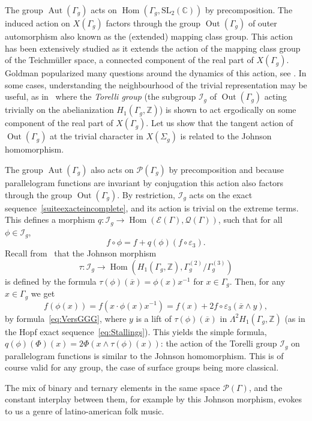 \documentclass[JEP,XML,SOM,Unicode,NoEqCountersInSection]{cedram}
\let\mathcal\mathscr
\theoremstyle{definition}
\newcommand{\ZZ}{\mathbb{Z}}
\newcommand{\CC}{\mathbb{C}}
\newcommand{\SL}{\mathrm{SL}}
\newcommand{\Aut}{\operatorname{Aut}}
\newcommand{\Out}{\operatorname{Out}}
\newcommand{\Hom}{\operatorname{Hom}}
\begin{document}
The group $\Aut(\Gamma_g)$ acts on $\Hom(\Gamma_g,\SL_2(\CC))$ by precomposition.
The induced action on $X(\Gamma_g)$ factors through the group
$\operatorname{Out}(\Gamma_g)$ of outer automorphism also known as the
(extended) mapping class group. This action has been extensively studied as
it extends the action of the mapping class group of the Teichmüller space,
a connected component of the real part of $X(\Gamma_g)$.
Goldman popularized many questions around the dynamics of this action,
see \eg \cite{goldman06}.
In some cases, understanding the neighbourhood of the trivial representation
may be useful, as in~\cite{FunarMarche} where the
{\em Torelli group} (\ie the subgroup
$\mathcal{I}_g$ of $\operatorname{Out}(\Gamma_g)$ acting trivially on
the abelianization $H_1(\Gamma_g,\ZZ)$) is shown to
act ergodically on some component of the real part of $X(\Gamma_g)$.
Let us show that the tangent action of $\Out(\Gamma_g)$ at the trivial
character in $X(\Sigma_g)$ is related to the Johnson homomorphism.

The group $\Aut(\Gamma_g)$ also acts on $\mathcal{P}(\Gamma_g)$
by precomposition and because parallelogram functions are invariant by
conjugation this action also factors through the group
$\operatorname{Out}(\Gamma_g)$.
By restriction, $\mathcal{I}_g$ acts on the exact
sequence~\eqref{suiteexacteincomplete},
and its action is trivial
on the extreme terms.
This
defines a morphism
$q\colon\mathcal{I}_g\to\Hom(\mathcal{E}(\Gamma),\mathcal{Q}(\Gamma))$,
such that for all $\phi\in\mathcal{I}_g$,
\[ f\circ\phi=f+q(\phi)(f\circ\varepsilon_3). \]
Recall from~\cite[Chap.\,6]{farbmargalit} that the Johnson morphism
\[
\tau:\mathcal{I}_g\to \Hom(H_1(\Gamma_g,\ZZ),\Gamma_g^{(2)}/\Gamma_g^{(3)})
\]
is defined by the formula $\tau(\phi)(\overline{x})=\phi(x)x^{-1}$ for
$x\in\Gamma_g$. Then, for any $x\in \Gamma_g$ we get
\[ f(\phi(x))=f(x\cdot \phi(x)x^{-1})=
f(x)+2f\circ\varepsilon_3(\overline{x}\wedge y), \]
by formula~\eqref{eq:VersGGG}, where $y$ is a lift of
$\tau(\phi)(\overline{x})$ in $\Lambda^2 H_1(\Gamma_g,\ZZ)$
(as in the Hopf exact sequence~\eqref{eq:Stallings}). This yields the simple
formula, $q(\phi)(\Phi)(x)=2\Phi(x\wedge \tau(\phi)(x))$: the action of the
Torelli group $\mathcal{I}_g$ on parallelogram functions is similar to the
Johnson homomorphism. This is of course valid for any group, the case of
surface groups being more classical.

The mix of binary and ternary elements in the same space
$\mathcal{P}(\Gamma)$, and the constant interplay between them, for example
by this Johnson morphism, evokes to us a genre of latino-american folk music.
\end{document}

